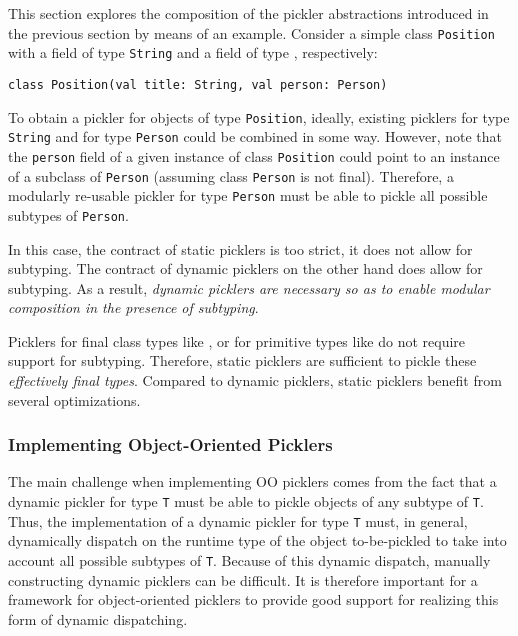 

This section explores the composition of the pickler abstractions introduced
in the previous section by means of an example. Consider a simple class
\verb|Position| with a field of type \verb|String| and a field of type ,
respectively:

\begin{lstlisting}
class Position(val title: String, val person: Person)
\end{lstlisting}

To obtain a pickler for objects of type \verb|Position|, ideally, existing
picklers for type \verb|String| and for type \verb|Person| could be combined
in some way. However, note that the \verb|person| field of a given instance of
class \verb|Position| could point to an instance of a subclass of
\verb|Person| (assuming class \verb|Person| is not final). Therefore, a
modularly re-usable pickler for type \verb|Person| must be able to pickle all
possible subtypes of \verb|Person|.

In this case, the contract of static picklers is too strict, it does not allow
for subtyping. The contract of dynamic picklers on the other hand does allow
for subtyping. As a result, {\em dynamic picklers are necessary so as to enable
modular composition in the presence of subtyping}.

Picklers for final class types like , or for primitive types like
 do not require support for subtyping. Therefore, static picklers
are sufficient to pickle these {\em effectively final types}. Compared to
dynamic picklers, static picklers benefit from several optimizations.

\subsubsection{Implementing Object-Oriented Picklers}

The main challenge when implementing OO picklers comes from the fact that a
dynamic pickler for type \verb|T| must be able to pickle objects of any subtype of
\verb|T|. Thus, the implementation of a dynamic pickler for type \verb|T| must, in
general, dynamically dispatch on the runtime type of the object to-be-pickled
to take into account all possible subtypes of \verb|T|. Because of this dynamic
dispatch, manually constructing dynamic picklers can be difficult. It is
therefore important for a framework for object-oriented picklers to provide
good support for realizing this form of dynamic dispatching.

